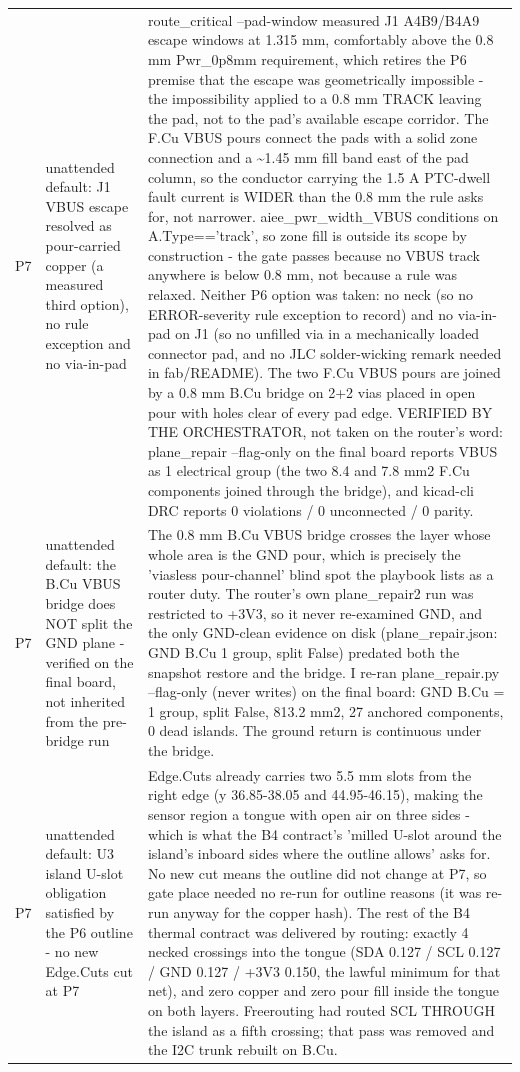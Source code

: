 \documentclass[11pt,a4paper]{article}
\begin{document}
{\begin{longtable}{lp{5.2cm}p{7.2cm}}
P7 & unattended default: J1 VBUS escape resolved as pour-carried copper (a measured third option), no rule exception and no via-in-pad & route\_critical --pad-window measured J1 A4B9/B4A9 escape windows at 1.315 mm, comfortably above the 0.8 mm Pwr\_0p8mm requirement, which retires the P6 premise that the escape was geometrically impossible - the impossibility applied to a 0.8 mm TRACK leaving the pad, not to the pad's available escape corridor. The F.Cu VBUS pours connect the pads with a solid zone connection and a \textasciitilde{}1.45 mm fill band east of the pad column, so the conductor carrying the 1.5 A PTC-dwell fault current is WIDER than the 0.8 mm the rule asks for, not narrower. aiee\_pwr\_width\_VBUS conditions on A.Type=='track', so zone fill is outside its scope by construction - the gate passes because no VBUS track anywhere is below 0.8 mm, not because a rule was relaxed. Neither P6 option was taken: no neck (so no ERROR-severity rule exception to record) and no via-in-pad on J1 (so no unfilled via in a mechanically loaded connector pad, and no JLC solder-wicking remark needed in fab/README). The two F.Cu VBUS pours are joined by a 0.8 mm B.Cu bridge on 2+2 vias placed in open pour with holes clear of every pad edge. VERIFIED BY THE ORCHESTRATOR, not taken on the router's word: plane\_repair --flag-only on the final board reports VBUS as 1 electrical group (the two 8.4 and 7.8 mm2 F.Cu components joined through the bridge), and kicad-cli DRC reports 0 violations / 0 unconnected / 0 parity. \\
P7 & unattended default: the B.Cu VBUS bridge does NOT split the GND plane - verified on the final board, not inherited from the pre-bridge run & The 0.8 mm B.Cu VBUS bridge crosses the layer whose whole area is the GND pour, which is precisely the 'viasless pour-channel' blind spot the playbook lists as a router duty. The router's own plane\_repair2 run was restricted to +3V3, so it never re-examined GND, and the only GND-clean evidence on disk (plane\_repair.json: GND B.Cu 1 group, split False) predated both the snapshot restore and the bridge. I re-ran plane\_repair.py --flag-only (never writes) on the final board: GND B.Cu = 1 group, split False, 813.2 mm2, 27 anchored components, 0 dead islands. The ground return is continuous under the bridge. \\
P7 & unattended default: U3 island U-slot obligation satisfied by the P6 outline - no new Edge.Cuts cut at P7 & Edge.Cuts already carries two 5.5 mm slots from the right edge (y 36.85-38.05 and 44.95-46.15), making the sensor region a tongue with open air on three sides - which is what the B4 contract's 'milled U-slot around the island's inboard sides where the outline allows' asks for. No new cut means the outline did not change at P7, so gate place needed no re-run for outline reasons (it was re-run anyway for the copper hash). The rest of the B4 thermal contract was delivered by routing: exactly 4 necked crossings into the tongue (SDA 0.127 / SCL 0.127 / GND 0.127 / +3V3 0.150, the lawful minimum for that net), and zero copper and zero pour fill inside the tongue on both layers. Freerouting had routed SCL THROUGH the island as a fifth crossing; that pass was removed and the I2C trunk rebuilt on B.Cu. \\

\end{longtable}}
\end{document}
